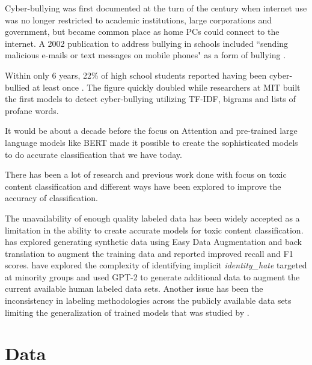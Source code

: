 \documentclass[11pt,a4paper]{article}
\begin{document}
Cyber-bullying was first documented at the turn of the century when internet use was no longer restricted to academic institutions, large corporations and government, but became common place as home PCs could connect to the internet.  A 2002 publication to address bullying in schools included ``sending malicious e-mails or text messages on mobile phones" as a form of bullying  \cite{haworth2002bullying}.

Within only 6 years, 22\% of high school students reported having been cyber-bullied at least once \cite{smith2008cyberbullying}.  The figure quickly doubled while researchers at MIT built the first models to detect cyber-bullying \cite{dinakar2011modeling} utilizing TF-IDF, bigrams and lists of profane words.

It would be about a decade before the focus on Attention \cite{NIPS2017_3f5ee243} and pre-trained large language models like BERT \cite{devlin2018bert} made it possible to create the sophisticated models to do accurate classification that we have today. 

There has been a lot of research and previous work done with focus on toxic content classification and different ways have been explored to improve the accuracy of classification. 

The unavailability of enough quality labeled data has been widely accepted as a limitation in the ability to create accurate models for toxic content classification. \citet*{rastogi2020can} has explored generating synthetic data using Easy Data Augmentation and back translation to augment the training data and reported improved recall and F1 scores. \citet*{hartvigsen2022toxigen} have explored the complexity of identifying implicit \emph{identity\_hate} targeted at minority groups and used GPT-2 to generate additional data to augment the current available human labeled data sets. 
Another issue has been the inconsistency in labeling methodologies across the publicly available data sets limiting the generalization of trained models that was studied by \citet*{fortuna2020toxic}. 

\section{Data}
\end{document}
